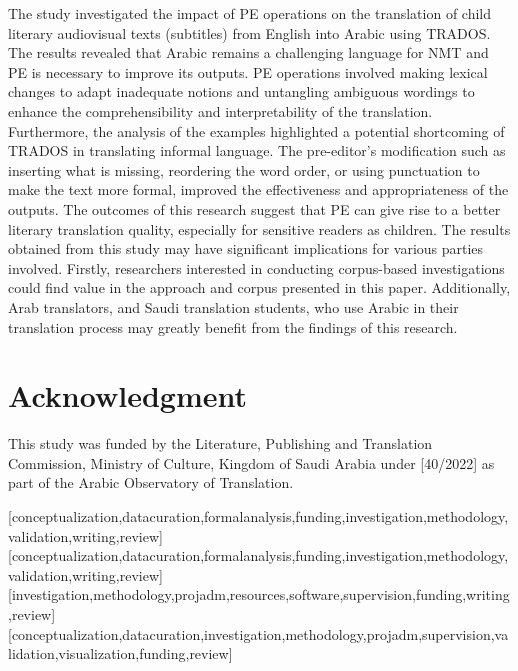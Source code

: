 \documentclass[english]{textolivre}
\begin{document}
The study investigated the impact of PE operations on the translation of child literary audiovisual texts (subtitles) from English into Arabic using TRADOS. The results revealed that Arabic remains a challenging language for NMT and PE is necessary to improve its outputs. PE operations involved making lexical changes to adapt inadequate notions and untangling ambiguous wordings to enhance the comprehensibility and interpretability of the translation. Furthermore, the analysis of the examples highlighted a potential shortcoming of TRADOS in translating informal language. The pre-editor’s modification such as inserting what is missing, reordering the word order, or using punctuation to make the text more formal, improved the effectiveness and appropriateness of the outputs. The outcomes of this research suggest that PE can give rise to a better literary translation quality, especially for sensitive readers as children. The results obtained from this study may have significant implications for various parties involved. Firstly, researchers interested in conducting corpus-based investigations could find value in the approach and corpus presented in this paper. Additionally, Arab translators, and Saudi translation students, who use Arabic in their translation process may greatly benefit from the findings of this research.

\section{Acknowledgment}

This study was funded by the Literature, Publishing and Translation Commission, Ministry of Culture, Kingdom of Saudi Arabia under [40/2022] as part of the Arabic Observatory of Translation.


\printbibliography\label{sec-bib}


\begin{contributors}
[conceptualization,datacuration,formalanalysis,funding,investigation,methodology,validation,writing,review]
[conceptualization,datacuration,formalanalysis,funding,investigation,methodology,validation,writing,review]
[investigation,methodology,projadm,resources,software,supervision,funding,writing,review]
[conceptualization,datacuration,investigation,methodology,projadm,supervision,validation,visualization,funding,review]
\end{contributors}
\end{document}
